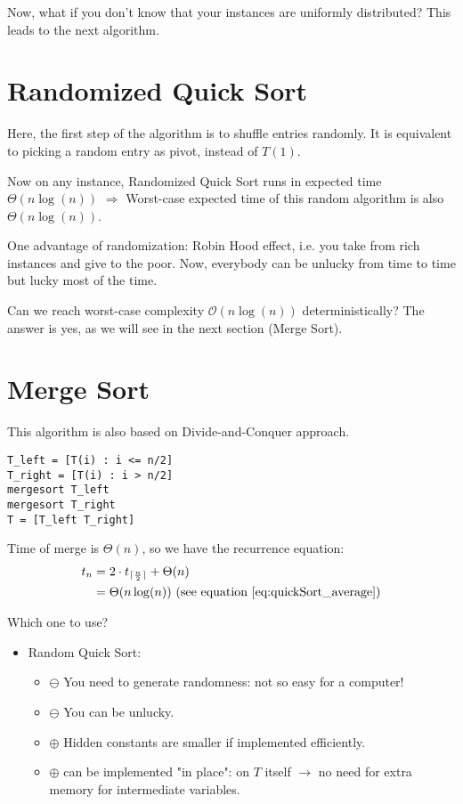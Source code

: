 Now, what if you don't know that your instances are uniformly distributed? This leads to the next algorithm.

\section{Randomized Quick Sort}
Here, the first step of the algorithm is to shuffle entries randomly. It is equivalent to picking a random entry as pivot, instead of $T(1)$.

Now on any instance, Randomized Quick Sort runs in expected time $\Theta(n \log(n))$ $\Rightarrow$ Worst-case expected time of this random algorithm is also $\Theta(n \log(n))$. 

One advantage of randomization: Robin Hood effect, i.e. you take from rich instances and give to the poor. Now, everybody can be unlucky from time to time but lucky most of the time. 

Can we reach worst-case complexity $\mathcal{O}(n \log(n))$ deterministically? 
\newline The answer is yes, as we will see in the next section (Merge Sort). 

\section{Merge Sort}

This algorithm is also based on Divide-and-Conquer approach. 

\begin{lstlisting}[label={list:c1:merge},caption=Pseudo-code of the merge sort algorithm]
T_left = [T(i) : i <= n/2]
T_right = [T(i) : i > n/2]
mergesort T_left
mergesort T_right
T = [T_left T_right]
\end{lstlisting}

Time of merge is $\Theta(n)$, so we have the recurrence equation: 
\begin{align*}
t_n & = 2 \cdot t_{\lceil \frac{n}{2}\rceil}+ \Theta(n) \\
& = \Theta(n \log(n))  \text{ (see equation~\eqref{eq:quickSort_average})}
\end{align*}

Which one to use?
\begin{itemize}
\renewcommand{\labelitemi}{$\bullet$}
	\item Random Quick Sort:
	 \begin{itemize}
		\item $\ominus$ You need to generate randomness: not so easy for a computer!
		\item $\ominus$ You can be unlucky.	
		\item $\oplus$ Hidden constants are smaller if implemented efficiently. 
		\item $\oplus$ can be implemented "in place": on $T$ itself $\rightarrow$ no need for extra memory for intermediate variables.
	\end{itemize} 
	
\end{itemize}



